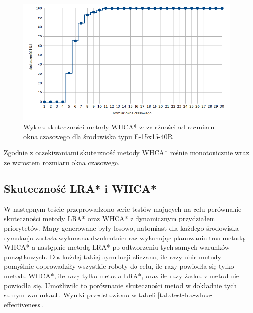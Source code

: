 \begin{figure}
	\centering
	\includegraphics[width=0.8\columnwidth]{img/plots/test-whca-window-E-15x15-40R}
	\caption{Wykres skuteczności metody WHCA* w zależności od rozmiaru okna czasowego dla środowiska typu E-15x15-40R}
	\label{fig:test-whca-window-E-15x15-40R}
\end{figure}

Zgodnie z oczekiwaniami skuteczność metody WHCA* rośnie monotonicznie wraz ze wzrostem rozmiaru okna czasowego.

\subsection{Skuteczność LRA* i WHCA*}
W następnym teście przeprowadzono serie testów mających na celu porównanie skuteczności metody LRA* oraz WHCA* z dynamicznym przydziałem priorytetów.
Mapy generowane były losowo, natomiast dla każdego środowiska symulacja została wykonana dwukrotnie: raz wykonując planowanie tras metodą WHCA* a następnie metodą LRA* po odtworzeniu tych samych warunków początkowych. Dla każdej takiej symulacji zliczano, ile razy obie metody pomyślnie doprowadziły wszystkie roboty do celu, ile razy powiodła się tylko metoda WHCA*, ile razy tylko metoda LRA*, oraz ile razy żadna z metod nie powiodła się.
Umożliwiło to porównanie skuteczności metod w dokładnie tych samym warunkach. Wyniki przedstawiono w tabeli \ref{tab:test-lra-whca-effectiveness}.

